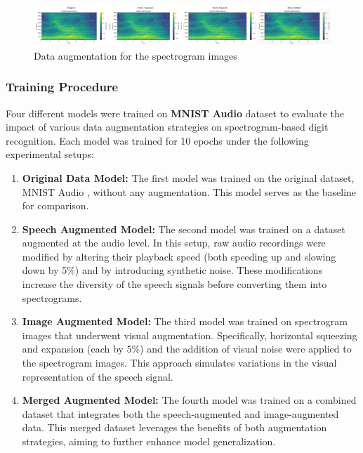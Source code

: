 \documentclass[a4paper,12pt]{article}
\begin{document}
\begin{figure}[h]
\centering
\includegraphics[width=\textwidth]{image_aug.png} %
\caption{Data augmentation for the spectrogram images}
\label{fig:image_aug}
\end{figure}



\subsubsection{Training Procedure}
Four different models were trained on \textbf{MNIST Audio} dataset to evaluate the impact of various data augmentation strategies on spectrogram-based digit recognition. Each model was trained for 10 epochs under the following experimental setups:

\begin{enumerate}
    \item \textbf{Original Data Model:}  
    The first model was trained on the original dataset, MNIST Audio , without any augmentation. This model serves as the baseline for comparison.

    \item \textbf{Speech Augmented Model:}  
    The second model was trained on a dataset augmented at the audio level. In this setup, raw audio recordings were modified by altering their playback speed (both speeding up and slowing down by 5\%) and by introducing synthetic noise. These modifications increase the diversity of the speech signals before converting them into spectrograms.

    \item \textbf{Image Augmented Model:}  
    The third model was trained on spectrogram images that underwent visual augmentation. Specifically, horizontal squeezing and expansion (each by 5\%) and the addition of visual noise were applied to the spectrogram images. This approach simulates variations in the visual representation of the speech signal.

    \item \textbf{Merged Augmented Model:}  
    The fourth model was trained on a combined dataset that integrates both the speech-augmented and image-augmented data. This merged dataset leverages the benefits of both augmentation strategies, aiming to further enhance model generalization.
\end{enumerate}
\end{document}
